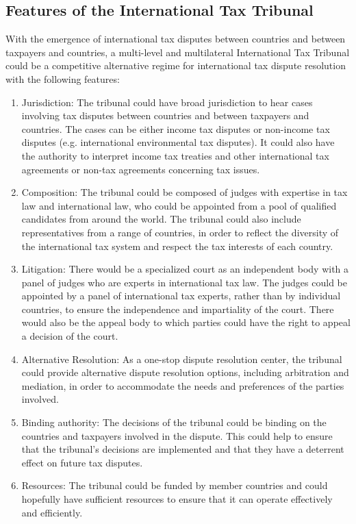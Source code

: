 \subsection{Features of the International Tax Tribunal} 

With the emergence of international tax disputes between countries and between taxpayers and countries, a multi-level and multilateral International Tax Tribunal could be a competitive alternative regime for international tax dispute resolution with the following features:

\begin{enumerate}
  \item Jurisdiction: The tribunal could have broad jurisdiction to hear cases involving tax disputes between countries and between taxpayers and countries. The cases can be either income tax disputes or non-income tax disputes (e.g. international environmental tax disputes). It could also have the authority to interpret income tax treaties and other international tax agreements or non-tax agreements concerning tax issues.
  \item Composition: The tribunal could be composed of judges with expertise in tax law and international law, who could be appointed from a pool of qualified candidates from around the world. The tribunal could also include representatives from a range of countries, in order to reflect the diversity of the international tax system and respect the tax interests of each country.
  \item Litigation: There would be a specialized court as an independent body with a panel of judges who are experts in international tax law. The judges could be appointed by a panel of international tax experts, rather than by individual countries, to ensure the independence and impartiality of the court. There would also be the appeal body to which parties could have the right to appeal a decision of the court.
  \item Alternative Resolution: As a one-stop dispute resolution center, the tribunal could provide alternative dispute resolution options, including arbitration and mediation, in order to accommodate the needs and preferences of the parties involved.
  \item Binding authority: The decisions of the tribunal could be binding on the countries and taxpayers involved in the dispute. This could help to ensure that the tribunal's decisions are implemented and that they have a deterrent effect on future tax disputes.
  \item Resources: The tribunal could be funded by member countries and could hopefully have sufficient resources to ensure that it can operate effectively and efficiently.
  
\end{enumerate}

